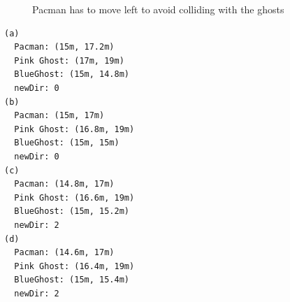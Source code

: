 \begin{figure}[!h]
	\caption{Pacman has to move left to avoid colliding with the ghosts} 
	\label{fig:PacmanFleeing}
\end{figure}

\begin{lstlisting}[caption={Values for the stream test},label=lst:pmStreamValues]
(a)
  Pacman: (15m, 17.2m) 
  Pink Ghost: (17m, 19m) 
  BlueGhost: (15m, 14.8m) 
  newDir: 0
(b)	
  Pacman: (15m, 17m) 
  Pink Ghost: (16.8m, 19m) 
  BlueGhost: (15m, 15m) 
  newDir: 0
(c)	
  Pacman: (14.8m, 17m) 
  Pink Ghost: (16.6m, 19m) 
  BlueGhost: (15m, 15.2m) 
  newDir: 2
(d)	
  Pacman: (14.6m, 17m) 
  Pink Ghost: (16.4m, 19m)
  BlueGhost: (15m, 15.4m)
  newDir: 2
\end{lstlisting}

